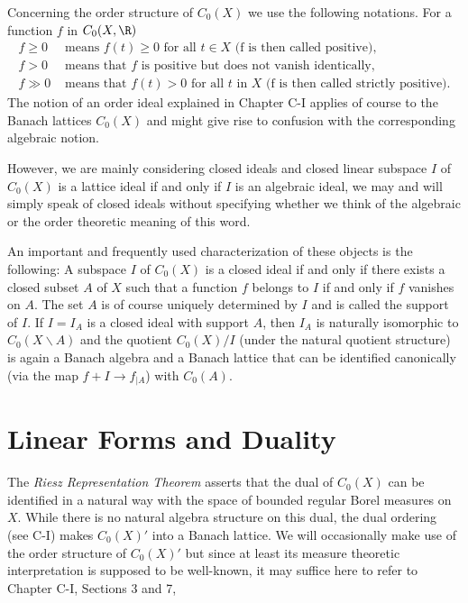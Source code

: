 Concerning the order structure of $C_{0}(X)$ we use the following notations.
For a function $f$ in $C_{0}(X,\R)$
\[
\begin{aligned}
	f \geq 0 &\text{ means } f(t) \geq 0 \text{ for all } t \in X \text{ (f is 			             then called positive)}, \\
	f > 0 &\text{ means that } f \text{ is positive but does not vanish identically}, \\
	f \gg 0 &\text{ means that } f(t) > 0 \text{ for all } t \text{ in } X \text{ (f is then called strictly positive)}.
\end{aligned}
\]
The notion of an order ideal explained in Chapter C-I applies of course to the Banach lattices $C_{0}(X)$ and might give rise to confusion with the corresponding algebraic notion.

However, we are mainly considering closed ideals and closed linear subspace $I$ of $C_{0}(X)$ is a lattice ideal if and only if $I$ is an algebraic ideal, we may and will simply speak of closed ideals without specifying whether we think of the algebraic or the order theoretic meaning of this word.

An important and frequently used characterization of these objects is the following: A subspace $I$ of $C_{0}(X)$ is a closed ideal if and only if there exists a closed subset $A$ of $X$ such that a function $f$ belongs to $I$ if and only if $f$ vanishes on $A$.
The set $A$ is of course uniquely determined by $I$ and is called the support of $I$.
If $I = I_{A}$ is a closed ideal with support $A$, then $I_{A}$ is naturally isomorphic to $C_{0}(X\backslash A)$ and the quotient $C_{0}(X)/I$ (under the natural quotient structure) is again a Banach algebra and a Banach lattice that can be identified canonically (via the map $f + I \to f_{|A}$) with $C_{0}(A)$.

\section{Linear Forms and Duality}\label{sec:b1-2}

The \emph{Riesz Representation Theorem} asserts that the dual of $C_{0}(X)$ can be identified in a natural way with the space of bounded regular Borel measures on $X$.
While there is no natural algebra structure on this dual, the dual ordering (see C-I) makes $C_{0}(X)'$ into a Banach lattice.
We will occasionally make use of the order structure of $C_{0}(X)'$ but since at least its measure theoretic interpretation is supposed to be well-known, it may suffice here to refer to Chapter C-I, Sections 3 and 7, 

